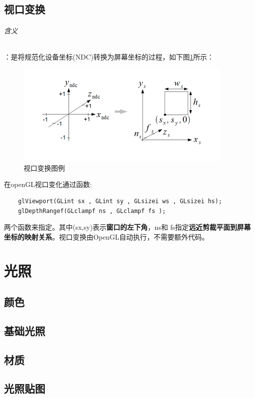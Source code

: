 \documentclass[UTF8,a4paper,12pt]{ctexbook}
\begin{document}
	\section{视口变换}
		\subparagraph{含义}：是将规范化设备坐标(NDC)转换为屏幕坐标的过程，如下图\ref{shikou}所示：
			\begin{figure}[htbp]
				\centering
				\includegraphics[scale = 1.2]{viewPort.png}
				\caption{视口变换图例}
				\label{shikou}
			\end{figure}
			
			在openGL视口变化通过函数: 
			\begin{lstlisting}
	glViewport(GLint sx , GLint sy , GLsizei ws , GLsizei hs); 
	glDepthRangef(GLclampf ns , GLclampf fs );
			\end{lstlisting}
			
			两个函数来指定。其中(sx,sy)表示\textbf{窗口的左下角}，ns和 fs指定\textbf{远近剪裁平面到屏幕坐标的映射关系}。视口变换由OpenGL自动执行，不需要额外代码。
			
			
			
			
\chapter{光照}
	\section{颜色}
	
	\section{基础光照}
	
	\section{材质}
	
	\section{光照贴图}		
			
\end{document}
